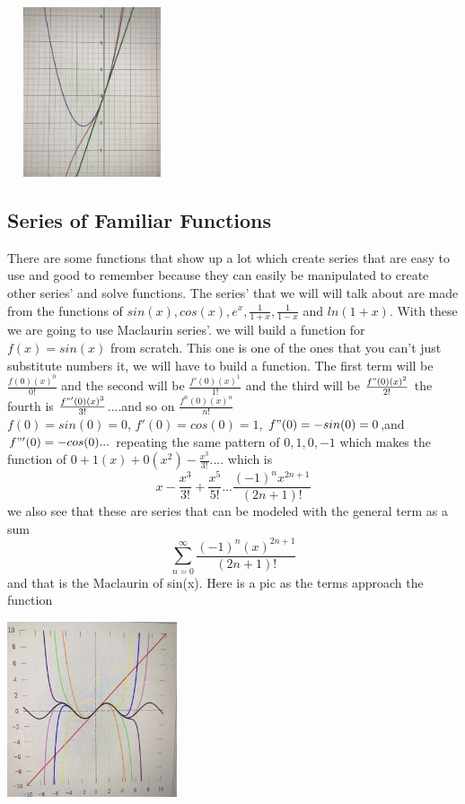 \documentclass[a4paper,openright, 14pt]{article}
\begin{document}
\begin{center}
    \includegraphics[width = 5cm, height = 5cm ]{graph.jpeg}
\end{center}
\subsection*{Series of Familiar Functions}
    There are some functions that show up a lot which create series that are easy to use and good to remember because they can easily be manipulated to create other series' and solve functions. The series' that we will will talk about are made from the functions of $sin(x), cos(x), e^x, \frac{1}{1+x}, \frac{1}{1-x}$ and $ln(1+x)$. With these we are going to use Maclaurin series'. we will build a function for $f(x)=sin(x)$ from scratch. This one is one of the ones that you can't just substitute numbers it, we will have to build a function. The first term will be $\frac{f(0)(x)^0}{0!}$ and the second will be $\frac{f'(0)(x)^1}{1!}$ and the third will be $\frac{f"(0)(x)^2}{2!}$ the fourth is $\frac{f"'(0)(x)^3}{3!}$....and so on $\frac{f^n(0)(x)^n}{n!}$
\\$f(0)=sin(0)=0$, $f'(0)=cos(0)=1$, $f"(0)=-sin(0)=0$,and $f"'(0)=-cos(0)...$ repeating the same pattern of $0,1,0,-1$ which makes the function of $0+1(x)+0(x^2)-\frac{x^3}{3!}....$ which is $$x-\frac{x^3}{3!}+\frac{x^5}{5!}...\frac{(-1)^nx^{2n+1}}{{(2n+1)}!}$$ we also see that these are series that can be modeled with the general term as a sum $$\sum_{n=0} ^\infty \frac{(-1)^n(x)^{2n+1}}{(2n+1)!}$$ and that is the Maclaurin of sin(x). Here is a pic as the terms approach the function \begin{center}
    \includegraphics[width = 5cm, height = 5 cm]{sin.jpeg}
\end{center}
\end{document}
